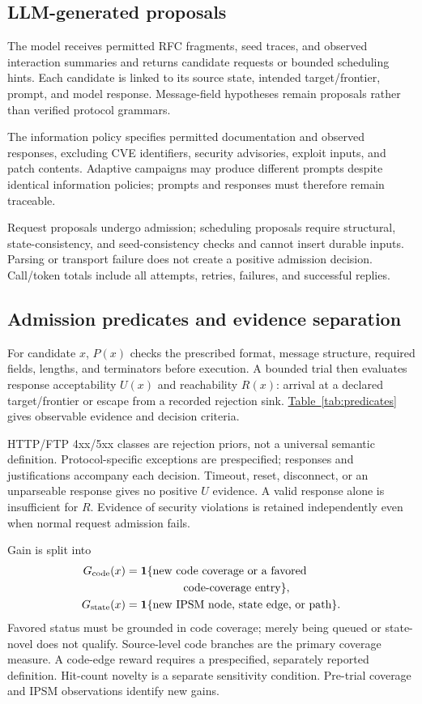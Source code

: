 \documentclass[final,5p,times,number]{elsarticle}
\newcommand{\gcode}{G_{\mathrm{code}}}
\newcommand{\gstate}{G_{\mathrm{state}}}
\newcommand{\namedref}[2]{\hyperref[#2]{#1~\ref*{#2}}}
\begin{document}
\subsection{LLM-generated proposals}
The model receives permitted RFC fragments, seed traces, and observed interaction summaries and returns candidate requests or bounded scheduling hints. Each candidate is linked to its source state, intended target/frontier, prompt, and model response. Message-field hypotheses remain proposals rather than verified protocol grammars.

The information policy specifies permitted documentation and observed responses, excluding CVE identifiers, security advisories, exploit inputs, and patch contents. Adaptive campaigns may produce different prompts despite identical information policies; prompts and responses must therefore remain traceable.

Request proposals undergo admission; scheduling proposals require structural, state-consistency, and seed-consistency checks and cannot insert durable inputs. Parsing or transport failure does not create a positive admission decision. Call/token totals include all attempts, retries, failures, and successful replies.

\subsection{Admission predicates and evidence separation}
For candidate $x$, $P(x)$ checks the prescribed format, message structure, required fields, lengths, and terminators before execution. A bounded trial then evaluates response acceptability $U(x)$ and reachability $R(x)$: arrival at a declared target/frontier or escape from a recorded rejection sink. \namedref{Table}{tab:predicates} gives observable evidence and decision criteria.

HTTP/FTP 4xx/5xx classes are rejection priors, not a universal semantic definition. Protocol-specific exceptions are prespecified; responses and justifications accompany each decision. Timeout, reset, disconnect, or an unparseable response gives no positive $U$ evidence. A valid response alone is insufficient for $R$. Evidence of security violations is retained independently even when normal request admission fails.

Gain is split into
\begin{align}
\gcode(x)&=\mathbf{1}\{\text{new code coverage or a favored}\nonumber\\
&\hspace{18mm}\text{code-coverage entry}\},\label{eq:gcode}\\
\gstate(x)&=\mathbf{1}\{\text{new IPSM node, state edge, or path}\}.\label{eq:gstate}
\end{align}
Favored status must be grounded in code coverage; merely being queued or state-novel does not qualify. Source-level code branches are the primary coverage measure. A code-edge reward requires a prespecified, separately reported definition. Hit-count novelty is a separate sensitivity condition. Pre-trial coverage and IPSM observations identify new gains.
\end{document}
